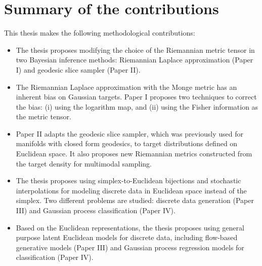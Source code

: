 \section*{Summary of the contributions} 
This thesis makes the following methodological contributions:
\begin{itemize}
    \item The thesis proposes modifying the choice of the Riemannian metric tensor in two Bayesian inference methods: Riemannian Laplace approximation ({Paper I}) and geodesic slice sampler ({Paper II}).
    \item  The Riemannian Laplace approximation with the Monge metric has an inherent bias on Gaussian targets. {Paper I} proposes two techniques to correct the bias: (i) using the logarithm map, and (ii) using the Fisher information as the metric tensor.
    \item {Paper II} adapts the geodesic slice sampler, which was previously used for manifolds with closed form geodesics, to target distributions defined on Euclidean space.  It also proposes new Riemannian metrics constructed from the target density for multimodal sampling. 
    \item The thesis proposes using simplex-to-Euclidean bijections and stochastic interpolations for modeling discrete data in Euclidean space instead of the simplex. Two different problems are studied: discrete data generation ({Paper III}) and  Gaussian process classification ({Paper IV}).     
    \item Based on the Euclidean representations, the thesis proposes using general purpose latent Euclidean models for discrete data, including flow-based generative models (Paper III) and Gaussian process regression models for classification (Paper IV).
    \end{itemize}
